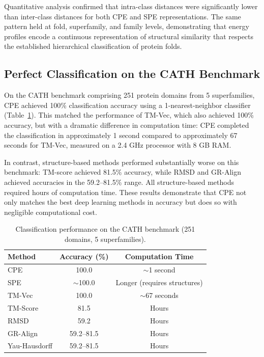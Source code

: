 \documentclass[11pt]{article}
\begin{document}
Quantitative analysis confirmed that intra-class distances were significantly lower than inter-class distances for both CPE and SPE representations. The same pattern held at fold, superfamily, and family levels, demonstrating that energy profiles encode a continuous representation of structural similarity that respects the established hierarchical classification of protein folds.

\subsection{Perfect Classification on the CATH Benchmark}

On the CATH benchmark comprising 251 protein domains from 5 superfamilies, CPE achieved 100\% classification accuracy using a 1-nearest-neighbor classifier (Table~\ref{tab:classification}). This matched the performance of TM-Vec, which also achieved 100\% accuracy, but with a dramatic difference in computation time: CPE completed the classification in approximately 1 second compared to approximately 67 seconds for TM-Vec, measured on a 2.4 GHz processor with 8 GB RAM.

In contrast, structure-based methods performed substantially worse on this benchmark: TM-score achieved 81.5\% accuracy, while RMSD and GR-Align achieved accuracies in the 59.2--81.5\% range. All structure-based methods required hours of computation time. These results demonstrate that CPE not only matches the best deep learning methods in accuracy but does so with negligible computational cost.

\begin{table}[htbp]
\centering
\caption{Classification performance on the CATH benchmark (251 domains, 5 superfamilies).}
\label{tab:classification}
\begin{tabular}{lcc}
\toprule
\textbf{Method} & \textbf{Accuracy (\%)} & \textbf{Computation Time} \\
\midrule
CPE & 100.0 & $\sim$1 second \\
SPE & $\sim$100.0 & Longer (requires structures) \\
TM-Vec & 100.0 & $\sim$67 seconds \\
TM-Score & 81.5 & Hours \\
RMSD & 59.2 & Hours \\
GR-Align & 59.2--81.5 & Hours \\
Yau-Hausdorff & 59.2--81.5 & Hours \\
\bottomrule
\end{tabular}
\end{table}
\end{document}
